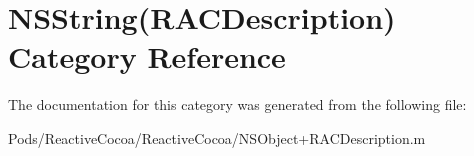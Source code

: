 \hypertarget{category_n_s_string_07_r_a_c_description_08}{}\section{N\+S\+String(R\+A\+C\+Description) Category Reference}
\label{category_n_s_string_07_r_a_c_description_08}


The documentation for this category was generated from the following file\+:\begin{DoxyCompactItemize}
\item 
Pods/\+Reactive\+Cocoa/\+Reactive\+Cocoa/N\+S\+Object+\+R\+A\+C\+Description.\+m\end{DoxyCompactItemize}
